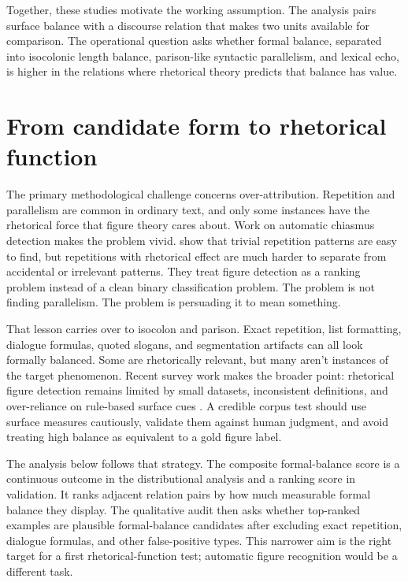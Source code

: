 \documentclass[12pt]{article}
\begin{document}
Together, these studies motivate the working assumption. The analysis
pairs surface balance with a discourse relation that makes two units
available for comparison. The operational question asks whether formal
balance, separated into isocolonic length balance, parison-like syntactic
parallelism, and lexical echo, is higher in the relations where
rhetorical theory predicts that balance has value.

\section{From candidate form to rhetorical function}

The primary methodological challenge concerns over-attribution. Repetition and
parallelism are common in ordinary text, and only some instances have the
rhetorical force that figure theory cares about. Work on automatic
chiasmus detection makes the problem vivid. \textcite{dubremetzNivre2018FigureDetection}
show that trivial repetition patterns are easy to find, but repetitions
with rhetorical effect are much harder to separate from accidental or
irrelevant patterns. They treat figure detection as a ranking
problem instead of a clean binary classification problem. The problem is
not finding parallelism. The problem is persuading it to mean something.

That lesson carries over to isocolon and parison. Exact repetition, list formatting,
dialogue formulas, quoted slogans, and segmentation artifacts can all
look formally balanced. Some are rhetorically relevant, but many aren't
instances of the target phenomenon. Recent survey work makes the broader
point: rhetorical figure detection remains limited by small datasets,
inconsistent definitions, and over-reliance on rule-based surface cues
\citep{kuehnMitrovic2024ElephantRoom,kuehnEtAl2024LesserKnownRhetoricalFigures}. A credible corpus
test should use surface measures cautiously, validate them
against human judgment, and avoid treating high balance as equivalent to
a gold figure label.

The analysis below follows that strategy. The composite formal-balance
score is a continuous outcome in the distributional analysis and a
ranking score in validation. It ranks adjacent relation pairs by how much
measurable formal balance they display. The qualitative audit then asks whether
top-ranked examples are plausible formal-balance candidates after
excluding exact repetition, dialogue formulas, and other false-positive
types. This narrower aim is the right target for a first rhetorical-function
test; automatic figure recognition would be a different task.
\end{document}
